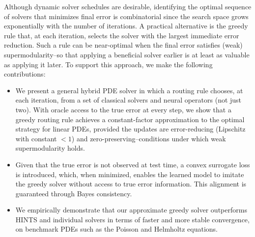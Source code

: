 \documentclass{article} %
\newcommand\ambuj[1]{\textcolor{red}{AT: #1}}
\begin{document}
Although dynamic solver schedules are desirable, identifying the optimal sequence of solvers that minimizes final error is combinatorial since the search space grows exponentially with the number of iterations. A practical alternative is the greedy rule that, at each iteration, selects the solver with the largest immediate error reduction.
Such a rule can be near-optimal when the final error satisfies (weak) supermodularity--so that applying a beneficial solver earlier is at least as valuable as applying it later. To support this approach, we make the following contributions:
\begin{itemize}
    \item We present a general hybrid PDE solver in which a routing rule chooses, at each iteration, from a set of classical solvers and neural operators (not just two).  
    With oracle access to the true error at every step, we show that a greedy routing rule
    achieves a constant-factor approximation to the optimal strategy for linear PDEs, provided the updates are error-reducing (Lipschitz with constant $<1$) and zero-preserving--conditions under which weak supermodularity holds.
    \item  Given that the true error is not observed at test time, a convex surrogate loss is introduced, which, when minimized, enables the learned model to imitate the greedy solver without access to true error information. This alignment is guaranteed through Bayes consistency.
    \item We empirically demonstrate that our approximate greedy solver outperforms HINTS and individual solvers in terms of faster and more stable convergence, on benchmark PDEs such as the Poisson and Helmholtz equations.
\end{itemize}


\end{document}
